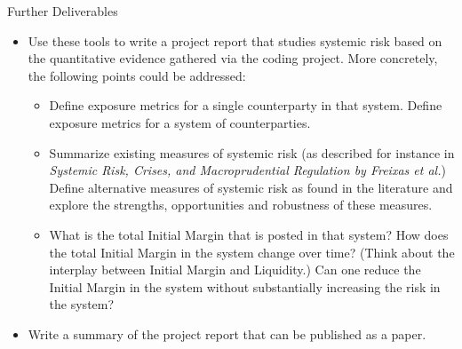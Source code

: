 \documentclass[t]{beamer}
\begin{document}
\begin{frame}{Further Deliverables}
	\begin{itemize}
		\item
			Use these tools to write a project report that studies systemic risk based on the quantitative evidence gathered via the coding project. More concretely, the following points could be addressed:
			\begin{itemize}
					\item 
						Define exposure metrics for a single counterparty in that system. Define exposure metrics for a system of counterparties. 
					\item
						Summarize existing measures of systemic risk (as described for instance in \emph{Systemic Risk, Crises, and Macroprudential Regulation by Freixas et al.}) Define alternative measures of systemic risk as found in the literature and explore the strengths, opportunities and robustness of these measures.
				\item
					What is the total Initial Margin that is posted in that system? How does the total Initial Margin in the system change over time? (Think about the interplay between Initial Margin and Liquidity.) Can one reduce the Initial Margin in the system without substantially increasing the risk in the system?
			\end{itemize}	
		\item
			Write a summary of the project report that can be published as a paper.
	\end{itemize}
\end{frame}
\end{document}

